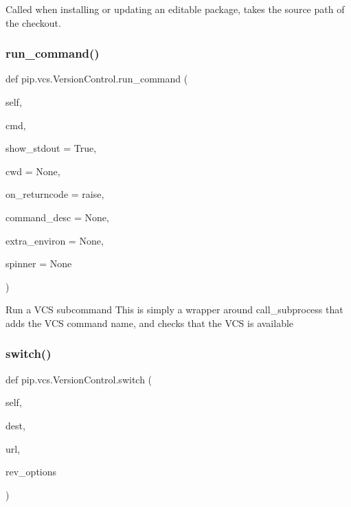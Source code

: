 \begin{DoxyVerb}Called when installing or updating an editable package, takes the
source path of the checkout.
\end{DoxyVerb}
 \mbox{\label{classpip_1_1vcs_1_1_version_control_a518028a938e11a2ab6122766d14105c5}} 
\subsubsection{\texorpdfstring{run\+\_\+command()}{run\_command()}}
{\footnotesize\ttfamily def pip.\+vcs.\+Version\+Control.\+run\+\_\+command (\begin{DoxyParamCaption}\item[{}]{self,  }\item[{}]{cmd,  }\item[{}]{show\+\_\+stdout = {\ttfamily True},  }\item[{}]{cwd = {\ttfamily None},  }\item[{}]{on\+\_\+returncode = {\ttfamily \textquotesingle{}raise\textquotesingle{}},  }\item[{}]{command\+\_\+desc = {\ttfamily None},  }\item[{}]{extra\+\_\+environ = {\ttfamily None},  }\item[{}]{spinner = {\ttfamily None} }\end{DoxyParamCaption})}

\begin{DoxyVerb}Run a VCS subcommand
This is simply a wrapper around call_subprocess that adds the VCS
command name, and checks that the VCS is available
\end{DoxyVerb}
 \mbox{\label{classpip_1_1vcs_1_1_version_control_a5a49d9df40b940ea3abdd08ca00ed819}} 
\subsubsection{\texorpdfstring{switch()}{switch()}}
{\footnotesize\ttfamily def pip.\+vcs.\+Version\+Control.\+switch (\begin{DoxyParamCaption}\item[{}]{self,  }\item[{}]{dest,  }\item[{}]{url,  }\item[{}]{rev\+\_\+options }\end{DoxyParamCaption})}

